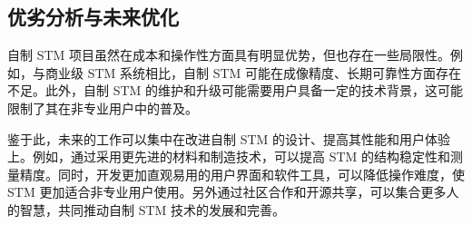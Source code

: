 \documentclass[zihao=-4]{ctexart}
\begin{document}
\begin{spacing}{1.5}
	
	\subsection{优劣分析与未来优化}
		自制 STM 项目虽然在成本和操作性方面具有明显优势，但也存在一些局限性。例如，与商业级 STM 系统相比，自制 STM 可能在成像精度、长期可靠性方面存在不足。此外，自制 STM 的维护和升级可能需要用户具备一定的技术背景，这可能限制了其在非专业用户中的普及。
		
		鉴于此，未来的工作可以集中在改进自制 STM 的设计、提高其性能和用户体验上。例如，通过采用更先进的材料和制造技术，可以提高 STM 的结构稳定性和测量精度。同时，开发更加直观易用的用户界面和软件工具，可以降低操作难度，使 STM 更加适合非专业用户使用。另外通过社区合作和开源共享，可以集合更多人的智慧，共同推动自制 STM 技术的发展和完善。
	





\end{spacing}



\newpage
{}
\end{document}
